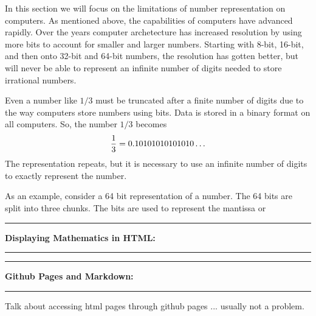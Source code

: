 \documentclass[10pt,fleqn]{article}
\begin{document}
In this section we will focus on the limitations of number representation on
computers. As mentioned above, the capabilities of computers have advanced
rapidly. Over the years computer
archetecture has increased resolution by using more bits to account for smaller
and larger numbers. Starting with 8-bit, 16-bit, and then onto 32-bit and 64-bit
numbers, the resolution has gotten better, but will never be able to represent
an infinite number of digits needed to store irrational numbers.

Even a number like \(1/3\) must be truncated after a finite number of digits due
to the way computers store numbers using bits. Data is stored in a binary format
on all computers. So, the number \(1/3\) becomes
\[
  {1\over 3} = 0.10101010101010\ldots
\]
The representation repeats, but it is necessary to use an infinite number of
digits to exactly represent the number.

As an example, consider a 64 bit representation of a number. The 64 bits are
split into three chunks. The bits are used to represent the mantissa or 




\vskip0.1in\hrule\vskip0.1in \noindent
{\bf Displaying Mathematics in HTML:}
\vskip0.1in\hrule\vskip0.1in \noindent
\vskip0.1in\hrule\vskip0.1in \noindent
{\bf Github Pages and Markdown:}
\vskip0.1in\hrule\vskip0.1in \noindent
Talk about accessing html pages through github pages ... usually not a problem.
\end{document}
